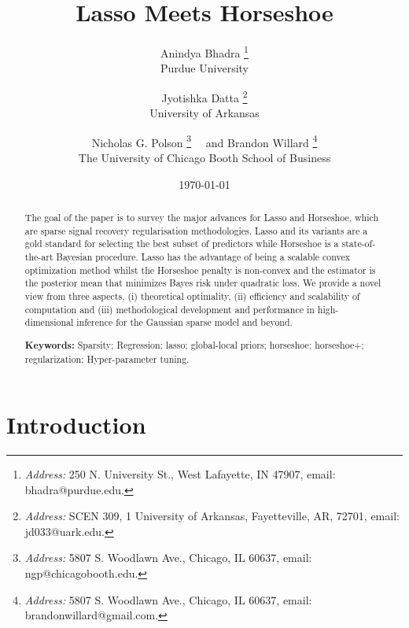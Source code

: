\documentclass[11pt]{article}
\title{Lasso Meets Horseshoe}
\author{Anindya Bhadra  \footnote{{\em Address:} 250 N. University St., West Lafayette, IN 47907, email: bhadra@purdue.edu.} \\Purdue University
\and Jyotishka Datta  \footnote{{\em Address:} SCEN 309, 1 University of Arkansas, Fayetteville, AR, 72701, email: jd033@uark.edu.}\\ University of Arkansas\\
\and Nicholas G. Polson \footnote{{\em Address:} 5807 S. Woodlawn Ave., Chicago, IL 60637, email: ngp@chicagobooth.edu.}  \ \ and Brandon Willard \footnote{{\em Address:} 5807 S. Woodlawn Ave., Chicago, IL 60637, email: brandonwillard@gmail.com.} \\The University of Chicago Booth School of
Business}
\date{\today}
\numberwithin{equation}{section}
\begin{document}
\maketitle
\baselineskip=15pt


\begin{abstract}
\baselineskip=15pt
\noindent %
The goal of the paper is to survey the major advances for Lasso and Horseshoe, which are sparse signal recovery regularisation methodologies. Lasso and its variants are a gold standard for selecting the best subset of predictors while Horseshoe is a state-of-the-art Bayesian procedure. Lasso has the advantage of being a scalable convex optimization method whilst the Horseshoe penalty is non-convex and the estimator is the posterior mean that minimizes Bayes risk under quadratic loss.  We provide a novel view from three aspects, (i) theoretical optimality, (ii) efficiency and scalability of computation and (iii) methodological development and performance in high-dimensional inference for the Gaussian sparse model and beyond. 


{\bf Keywords:} Sparsity; Regression; lasso; global-local priors; horseshoe; horseshoe+; regularization; Hyper-parameter tuning. 
\end{abstract}

\section{Introduction}


\end{document}
